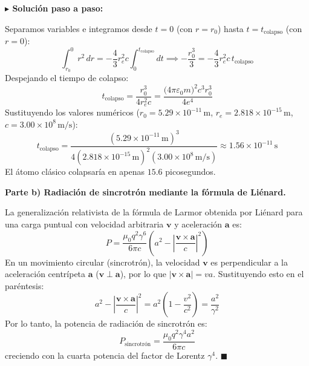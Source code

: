 \documentclass[11pt,a4paper]{book}
\newenvironment{solucion}{%
    \par\medskip\noindent\textbf{\color{blue!65!black}\Large $\blacktriangleright$ Solución paso a paso:}\par\medskip
}{%
    \hfill$\blacksquare$\par\bigskip
}
\begin{document}
\begin{solucion}
Separamos variables e integramos desde $t = 0$ (con $r = r_0$) hasta $t = t_{\text{colapso}}$ (con $r = 0$):
\begin{equation}
    \int_{r_0}^{0} r^2\,dr = -\frac{4}{3} r_e^2 c \int_{0}^{t_{\text{colapso}}} dt \implies -\frac{r_0^3}{3} = -\frac{4}{3} r_e^2 c \, t_{\text{colapso}}
\end{equation}
Despejando el tiempo de colapso:
\begin{equation}
    t_{\text{colapso}} = \frac{r_0^3}{4 r_e^2 c} = \frac{\big(4\pi\varepsilon_0 m\big)^2 c^3 r_0^3}{4 e^4}
\end{equation}
Sustituyendo los valores numéricos ($r_0 = 5.29 \times 10^{-11}\,\text{m}$, $r_e = 2.818 \times 10^{-15}\,\text{m}$, $c = 3.00 \times 10^8\,\text{m/s}$):
\begin{equation}
    t_{\text{colapso}} = \frac{(5.29 \times 10^{-11}\,\text{m})^3}{4 (2.818 \times 10^{-15}\,\text{m})^2 (3.00 \times 10^8\,\text{m/s})} \approx 1.56 \times 10^{-11}\,\text{s}
\end{equation}
El átomo clásico colapsaría en apenas $15.6$ picosegundos.

\medskip
\textbf{Parte b) Radiación de sincrotrón mediante la fórmula de Liénard.}

La generalización relativista de la fórmula de Larmor obtenida por Liénard para una carga puntual con velocidad arbitraria $\bm{v}$ y aceleración $\bm{a}$ es:
\begin{equation}
    P = \frac{\mu_0 q^2 \gamma^6}{6\pi c} \left( a^2 - \left|\frac{\bm{v} \times \bm{a}}{c}\right|^2 \right)
\end{equation}
En un movimiento circular (sincrotrón), la velocidad $\bm{v}$ es perpendicular a la aceleración centrípeta $\bm{a}$ ($\bm{v} \perp \bm{a}$), por lo que $|\bm{v} \times \bm{a}| = v a$. Sustituyendo esto en el paréntesis:
\begin{equation}
    a^2 - \left|\frac{\bm{v} \times \bm{a}}{c}\right|^2 = a^2\left(1 - \frac{v^2}{c^2}\right) = \frac{a^2}{\gamma^2}
\end{equation}
Por lo tanto, la potencia de radiación de sincrotrón es:
\begin{equation}
    P_{\text{sincrotrón}} = \frac{\mu_0 q^2 \gamma^4 a^2}{6\pi c}
\end{equation}
creciendo con la cuarta potencia del factor de Lorentz $\gamma^4$.
\end{solucion}

\end{document}
